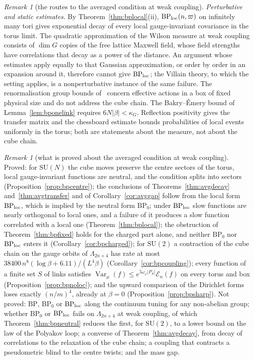 \documentclass[aps,prd,twocolumn,superscriptaddress,nofootinbib,longbibliography,floatfix,amsmath,amssymb,10pt]{revtex4-2}
\theoremstyle{definition}
\theoremstyle{remark}
\newtheorem{remark}[theorem]{Remark}
\newcommand{\SU}{\mathrm{SU}}
\newcommand{\Var}{\operatorname{Var}}
\begin{document}
\begin{remark}[the routes to the averaged condition at weak
coupling]
\emph{Perturbative and static estimates.} By Theorem~\ref{thm:bplocal}(ii),
$\mathrm{BP}_{\rm loc}(n,\varpi)$ on infinitely many tori gives exponential
decay of every local gauge-invariant covariance in the torus limit. The
quadratic approximation of the Wilson measure at weak coupling consists of
$\dim G$ copies of the free lattice Maxwell field, whose field strengths have
correlations that decay as a power of the distance. An argument whose
estimates apply equally to that Gaussian approximation, or order by order in
an expansion around it, therefore cannot give $\mathrm{BP}_{\rm loc}$; the
Villain theory, to which the setting applies, is a nonperturbative instance
of the same failure. The renormalisation group bounds
of~\cite{Bal84a,Bal85a,Bal89b} concern effective actions in a box of fixed
physical size and do not address the cube chain. The Bakry--\'Emery bound of
Lemma~\ref{lem:bponelink} requires $6N\lvert\beta\rvert<\kappa_G$.
Reflection positivity gives the transfer matrix and the chessboard estimate
bounds probabilities of local events uniformly in the torus; both are
statements about the measure, not about the cube chain.
\end{remark}

\begin{remark}[what is proved about the averaged condition at weak
coupling]\label{rem:bpweakstatus}
Proved: for $\SU(N)$ the cube moves preserve the centre sectors of the
torus, local gauge-invariant functions are neutral, and the condition splits
into sectors (Proposition~\ref{prop:bpcentre}); the conclusions of
Theorems~\ref{thm:avgdecay} and~\ref{thm:avgtransfer} and of
Corollary~\ref{cor:avggap} follow from the local form $\mathrm{BP}_{\rm loc}$,
which is implied by the neutral form $\mathrm{BP}_0$; under
$\mathrm{BP}_{\rm loc}$ slow functions are nearly orthogonal to local ones,
and a failure of it produces a slow function correlated with a local one
(Theorem~\ref{thm:bplocal}); the obstruction of Theorem~\ref{thm:bpfixed}
holds for the charged part alone, and neither $\mathrm{BP}_0$ nor
$\mathrm{BP}_{\rm loc}$ enters it (Corollary~\ref{cor:bpcharged}); for
$\SU(2)$ a contraction of the cube chain on the gauge orbits of
$\Lambda_{2n+4}$ has rate at most $38400\,n^8(\log\beta+6.11)/(L^4\beta)$
(Corollary~\ref{cor:bpcoupling}); every function of a finite set $S$ of links
satisfies $\Var_\mu(f)\le e^{5\omega_\varphi\lvert P_S\rvert}\mathcal E_n(f)$
on every torus and box (Proposition~\ref{prop:bpnoloc}); and the upward
comparison of the Dirichlet forms loses exactly $(n/m)^4$, already at
$\beta=0$ (Proposition~\ref{prop:bpsharp}). Not proved: $\mathrm{BP}$,
$\mathrm{BP}_0$ or $\mathrm{BP}_{\rm loc}$ along the continuum tuning for
any non-abelian group; whether $\mathrm{BP}_0$ or $\mathrm{BP}_{\rm loc}$
fails on $\Lambda_{2n+4}$ at weak coupling, of which
Theorem~\ref{thm:bpneutral} reduces the first, for $\SU(2)$, to a lower
bound on the law of the Polyakov loop; a converse of
Theorem~\ref{thm:avgdecay}, from decay of correlations to the relaxation of
the cube chain; a coupling that contracts a pseudometric blind to the centre
twists; and the mass gap.
\end{remark}
\end{document}
